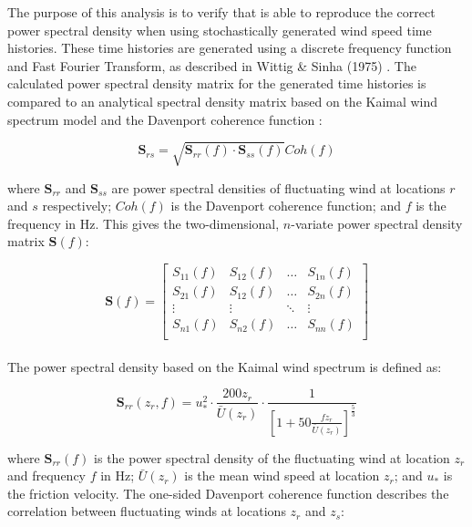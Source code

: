 The purpose of this analysis is to verify
that \texttt{\getsoftwarename{}} is able to reproduce the correct
power spectral density when using stochastically generated wind speed
time histories. These time histories are generated using a discrete
frequency function and Fast Fourier Transform, as described in
Wittig \& Sinha (1975) \cite{wittig1975simulation}. The calculated
power spectral density matrix for the generated time histories is compared to
an analytical spectral density matrix based on the Kaimal wind spectrum
model \cite{kaimal1972spectral, simiu1996wind} and the Davenport coherence
function \cite{davenport1967dependence}:

\begin{equation}
\bm{S}_{rs} = \sqrt{\bm{S}_{rr}(f) \cdot \bm{S}_{ss}(f)} Coh(f)
\end{equation}

\noindent where $\bm{S}_{rr}$ and $\bm{S}_{ss}$ are power spectral densities
of fluctuating wind at locations $r$ and $s$ respectively; $Coh(f)$ is the
Davenport coherence function; and $f$ is the frequency in Hz. This gives
the two-dimensional, $n$-variate power spectral density matrix $\bm{S}(f)$:

\begin{equation}
   \bm{S}(f) =
      \begin{bmatrix}
         S_{11}(f) & S_{12}(f) & \dots & S_{1n}(f) \\
         S_{21}(f) & S_{12}(f) & \dots & S_{2n}(f) \\
         \vdots & \vdots & \ddots & \vdots \\
         S_{n1}(f) & S_{n2}(f) & \dots & S_{nn}(f) \\         
      \end{bmatrix}
\end{equation}\\

\noindent The power spectral density based on the Kaimal wind spectrum is
defined as:

\begin{equation}
\bm{S}_{rr}(z_{r}, f) = u_{*}^{2} \cdot \frac{200 z_{r}}{\bar{U}(z_{r})} \cdot
              \frac{1}{\left[1 + 50 \frac{f z_{r}}{\bar{U}(z_{r})}\right]^{\frac{5}{3}}}
\end{equation}

\noindent where $\bm{S}_{rr}(f)$ is the power spectral density of the fluctuating
wind at location $z_{r}$ and frequency $f$ in Hz; $\bar{U}(z_{r})$ is
the mean wind speed at location $z_{r}$; and $u_{*}$ is the friction
velocity. The one-sided Davenport coherence function describes the correlation
between fluctuating winds at locations $z_{r}$ and $z_{s}$:

